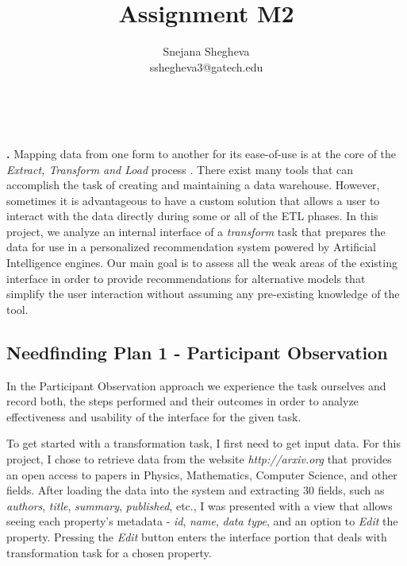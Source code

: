 \documentclass[12pt,letterpaper]{article}
\makeatletter
\renewcommand{\maketitle}{\bgroup
   \begin{center}
   \textbf{{\fontsize{18pt}{20}\selectfont \@title}}\\
   \vspace{10pt}
   {\fontsize{12pt}{0}\selectfont \@author} 
   \end{center}
}
\newenvironment{myquote}[1]%
  {\list{}{\leftmargin=#1\rightmargin=#1}\item[]}%
  {\endlist}
\renewenvironment{abstract}
{\vspace*{-.5in}\fontsize{12pt}{12}\begin{myquote}{.5in}
\noindent \par{\bfseries \abstractname.}}
{\medskip\noindent
\end{myquote}
}
\makeatother
\begin{document}
\title{Assignment M2}
\author{Snejana Shegheva \\ sshegheva3@gatech.edu}

\maketitle
\thispagestyle{fancy}

\begin{abstract}
Mapping data from one form to another for its ease-of-use is at the core of the \textit{Extract, Transform and Load} process \cite{wiki:etl}. There exist many tools that can accomplish the task of creating and maintaining a data warehouse. However, sometimes it is advantageous to have a custom solution that allows a user to interact with the data directly during some or all of the ETL phases. In this project, we analyze an internal interface of a \textit{transform} task that prepares the data for use in a personalized recommendation system powered by Artificial Intelligence engines. Our main goal is to assess all the weak areas of the existing interface in order to provide recommendations for alternative models that simplify the user interaction without assuming any pre-existing knowledge of the tool.
\end{abstract}

\subsection*{Needfinding Plan 1 - Participant Observation}
In the Participant Observation approach we experience the task ourselves and record both, the steps performed and their outcomes in order to analyze effectiveness and usability of the interface for the given task. 

To get started with a transformation task, I first need to get input data. For this project, I chose to retrieve data from the website \textit{http://arxiv.org} that provides an open access to papers in Physics, Mathematics, Computer Science, and other fields. After loading the data into the system and extracting 30 fields, such as \textit{authors}, \textit{title}, \textit{summary}, \textit{published}, etc., I was presented with a view that allows seeing each property's metadata - \textit{id}, \textit{name}, \textit{data type}, and an option to \textit{Edit} the property. Pressing the \textit{Edit} button enters the interface portion that deals with transformation task for a chosen property.    
\end{document}
